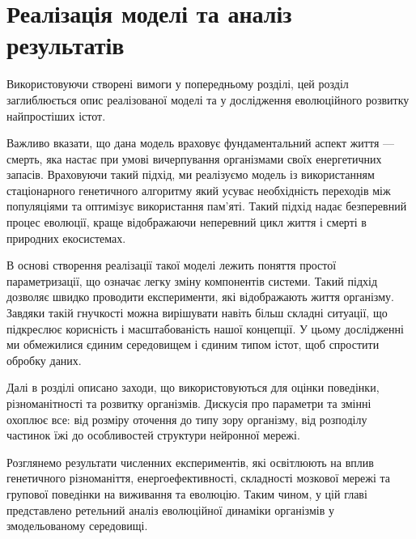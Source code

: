 \chapter{Реалізація моделі та аналіз результатів}
\label{chap:practice}

Використовуючи створені вимоги у попередньому розділі, 
цей розділ заглиблюється опис реалізованої моделі 
та у дослідження еволюційного розвитку найпростіших істот. 

Важливо вказати, що дана модель враховує фундаментальний
аспект життя --- смерть, яка настає при умові вичерпування організмами
своїх енергетичних запасів.
Враховуючи такий підхід, ми реалізуємо модель із використанням
стаціонарного генетичного алгоритму
який усуває необхідність переходів між популяціями та оптимізує використання пам'яті. 
Такий підхід надає безперевний процес еволюції, 
краще відображаючи неперевний цикл життя і смерті в природних екосистемах.

В основі створення реалізації такої моделі лежить поняття простої параметризації, 
що означає легку зміну компонентів системи.
Такий підхід дозволяє швидко проводити експерименти, які відображають життя організму.
Завдяки такій гнучкості можна вирішувати навіть більш складні ситуації, 
що підкреслює корисність і масштабованість нашої концепції. 
У цьому дослідженні ми обмежилися єдиним середовищем і єдиним типом істот, 
щоб спростити обробку даних.


Далі в розділі описано заходи, що використовуються для оцінки поведінки, 
різноманітності та розвитку організмів. 
Дискусія про параметри та змінні охоплює все: 
від розміру оточення до типу зору організму, 
від розподілу частинок їжі до особливостей структури нейронної мережі.

Розглянемо результати численних експериментів, 
які освітлюють на вплив генетичного різноманіття, 
енергоефективності, складності мозкової мережі та 
групової поведінки на виживання та еволюцію. 
Таким чином, у цій главі представлено ретельний аналіз 
еволюційної динаміки організмів у змодельованому середовищі.

